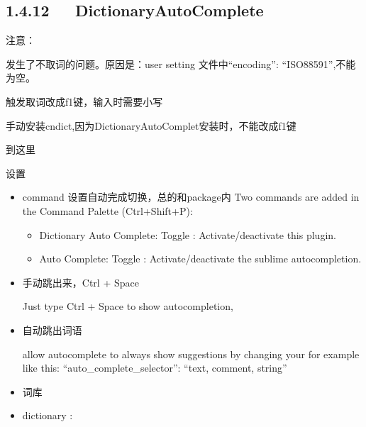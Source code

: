 \documentclass[letterpaper,12pt,english]{sphinxmanual}
\begin{document}
\subsection{1.4.12   Dictionary​Auto​Complete}
\label{\detokenize{001software/001install/sublime:dictionaryautocomplete}}

注意：

发生了不取词的问题。原因是：user setting 文件中“encoding”:
“ISO\sphinxhyphen{}8859\sphinxhyphen{}1”,不能为空。

触发取词改成f1键，输入时需要小写

手动安装cndict,因为Dictionary​Auto​Complet安装时，不能改成f1键

到这里

设置
\begin{itemize}
\item {} 
command 设置自动完成切换，总的和package内 Two commands are added in
the Command Palette (Ctrl+Shift+P):
\begin{itemize}
\item {} 
Dictionary Auto Complete: Toggle : Activate/deactivate this
plug\sphinxhyphen{}in.

\item {} 
Auto Complete: Toggle : Activate/deactivate the sublime
auto\sphinxhyphen{}completion.

\end{itemize}

\item {} 
手动跳出来，Ctrl + Space

Just type Ctrl + Space to show auto\sphinxhyphen{}completion,

\item {} 
自动跳出词语

allow auto\sphinxhyphen{}complete to always show suggestions by changing your
 for example like this:
“auto\_complete\_selector”: “text, comment, string”

\item {} 
词库

\end{itemize}

\begin{itemize}
\item {} 
dictionary :

\end{itemize}
\end{document}
